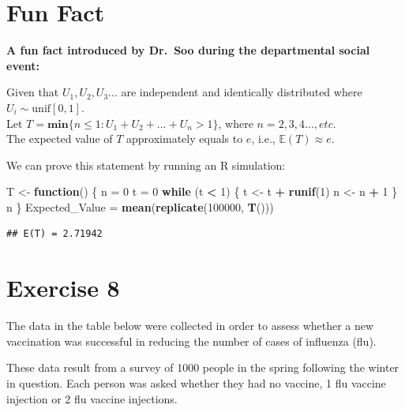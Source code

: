 \documentclass[
]{book}
\newenvironment{Shaded}{\begin{snugshade}}{\end{snugshade}}
\newcommand{\ControlFlowTok}[1]{\textcolor[rgb]{0.13,0.29,0.53}{\textbf{#1}}}
\newcommand{\DecValTok}[1]{\textcolor[rgb]{0.00,0.00,0.81}{#1}}
\newcommand{\FunctionTok}[1]{\textcolor[rgb]{0.13,0.29,0.53}{\textbf{#1}}}
\newcommand{\NormalTok}[1]{#1}
\newcommand{\OtherTok}[1]{\textcolor[rgb]{0.56,0.35,0.01}{#1}}
\newcommand{\SpecialCharTok}[1]{\textcolor[rgb]{0.81,0.36,0.00}{\textbf{#1}}}
\begin{document}
\chapter{Fun Fact}\label{fun-fact}

\textbf{A fun fact introduced by Dr.~Soo during the departmental social event:}

Given that \(U_1, U_2, U_3...\) are independent and identically distributed where \(U_i \sim \text{unif}[0,1]\).\\
Let \(T = \textbf{min}\{n \leq 1: U_1 + U_2 + ... + U_n > 1\}\), where \(n = 2, 3, 4..., etc\).\\
The expected value of \(T\) approximately equals to \(e\), i.e., \(\mathbb{E}(T) \approx e\).

We can prove this statement by running an R simulation:

\begin{Shaded}
\begin{Highlighting}[]
\NormalTok{T }\OtherTok{\textless{}{-}} \ControlFlowTok{function}\NormalTok{() \{}
\NormalTok{  n }\OtherTok{=} \DecValTok{0}
\NormalTok{  t }\OtherTok{=} \DecValTok{0}
  \ControlFlowTok{while}\NormalTok{ (t }\SpecialCharTok{\textless{}} \DecValTok{1}\NormalTok{) \{}
\NormalTok{    t }\OtherTok{\textless{}{-}}\NormalTok{ t }\SpecialCharTok{+} \FunctionTok{runif}\NormalTok{(}\DecValTok{1}\NormalTok{)}
\NormalTok{    n }\OtherTok{\textless{}{-}}\NormalTok{ n }\SpecialCharTok{+} \DecValTok{1}
\NormalTok{  \}}
\NormalTok{  n}
\NormalTok{\}}
\NormalTok{Expected\_Value }\OtherTok{=} \FunctionTok{mean}\NormalTok{(}\FunctionTok{replicate}\NormalTok{(}\DecValTok{100000}\NormalTok{, }\FunctionTok{T}\NormalTok{()))}
\end{Highlighting}
\end{Shaded}

\begin{verbatim}
## E(T) = 2.71942
\end{verbatim}

\chapter{Exercise 8}\label{exercise-8}

The data in the table below were collected in order to assess whether a new vaccination was
successful in reducing the number of cases of influenza (flu).

These data result from a survey of 1000 people in the spring following the winter in question. Each
person was asked whether they had no vaccine, 1 flu vaccine injection or 2 flu vaccine injections.
\end{document}
